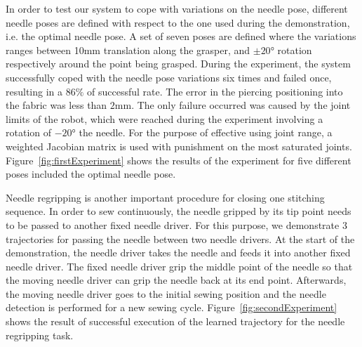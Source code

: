In order to test our system to cope with variations on the needle pose, different needle poses are defined with respect to the one used during the demonstration, i.e. the optimal needle pose. A set of seven poses are defined where the variations ranges between 10mm translation along the grasper, and $±20°$ rotation respectively around the point being grasped. During the experiment, the system successfully coped with the needle pose variations six times and failed once, resulting in a $86\%$ of successful rate. The error in the piercing positioning into the fabric was less than $2$mm. The only failure occurred was caused by the joint limits of the robot, which were reached during the experiment involving a rotation of $-20°$ the needle. For the purpose of effective using joint range, a weighted Jacobian matrix is used with punishment on the most saturated joints. Figure~\ref{fig:firstExperiment} shows the results of the experiment for five different poses included the optimal needle pose.

\begin{figure}
\end{figure}

Needle regripping is another important procedure for closing one stitching sequence. In order to sew continuously, the needle gripped by its tip point needs to be passed to another fixed needle driver. For this purpose, we demonstrate 3 trajectories for passing the needle between two needle drivers. At the start of the demonstration, the needle driver takes the needle and feeds it into another fixed needle driver. The fixed needle driver grip the middle point of the needle so that the moving needle driver can grip the needle back at its end point. Afterwards, the moving needle driver goes to the initial sewing position and the needle detection is performed for a new sewing cycle. Figure~\ref{fig:secondExperiment} shows the result of successful execution of the learned trajectory for the needle regripping task.

